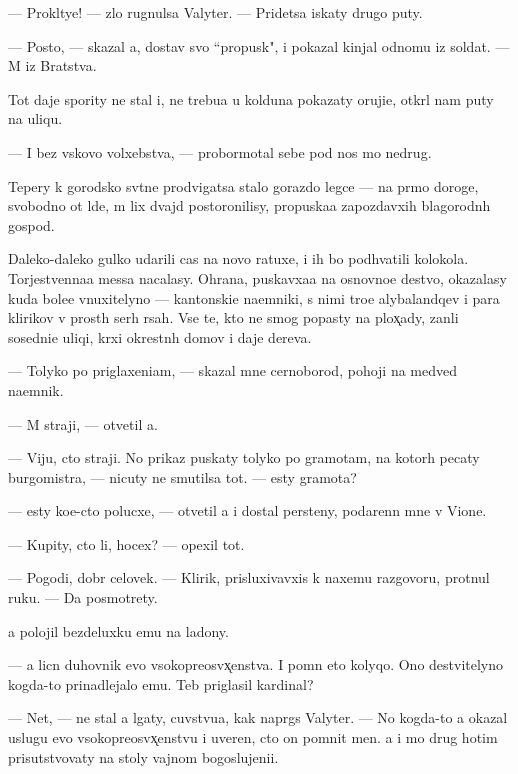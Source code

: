 \documentclass[10pt]{book}
\begin{document}
— Prokl{\ia}tye! — zlo rugnulsa Valyter. — Pridetsa iskaty drugo{\y} puty.

— Posto{\y}, — skazal {\y}a, dostav svo{\y} ``propusk", i pokazal kinjal odnomu iz soldat. — M{\yi} iz Bratstva.

Tot daje spority ne stal i, ne trebu{\y}a u kolduna pokazaty oruji{\y}e, otkr{\yi}l nam puty na uliqu.

— I bez vs{\ia}kovo volxebstva, — probormotal sebe pod nos mo{\y} nedrug.

Tepery k gorodsko{\y} sv{\ia}t{\yi}ne prodvigatsa stalo gorazdo legce — na pr{\ia}mo{\y} doroge, svobodno{\y} ot l{\iu}de{\y}, m{\yi} lix dvajd{\yi} postoronilisy, propuska{\y}a zapozdavxih blagorodn{\yi}h gospod.

Daleko-daleko gulko udarili cas{\yi} na novo{\y} ratuxe, i ih bo{\y} podhvatili kolokola. Torjestvenna{\y}a messa nacalasy. Ohrana, puskavxa{\y}a na osnovno{\y}e de{\y}stvo, okazalasy kuda bole{\y}e vnuxitelyno{\y} — kantonski{\y}e na{\y}emniki, s nimi tro{\y}e alybalandqev i para klirikov v prost{\yi}h ser{\yi}h r{\ia}sah. Vse te, kto ne smog popasty na plox̨ady, zan{\ia}li sosedni{\y}e uliqi, kr{\yi}xi okrestn{\yi}h domov i daje derev{\y}a.

— Tolyko po priglaxeni{\y}am, — skazal mne cernoborod{\yi}{\y}, pohoji{\y} na medved{\ia} na{\y}emnik.

— M{\yi} straji, — otvetil {\y}a.

— Viju, cto straji. No prikaz puskaty tolyko po gramotam, na kotor{\yi}h pecaty burgomistra, — nicuty ne smutilsa tot. — {\Y}esty gramota?

— {\Y}esty ko{\y}e-cto polucxe, — otvetil {\y}a i dostal persteny, podarenn{\yi}{\y} mne v Vione.

— Kupity, cto li, hocex? — opexil tot.

— Pogodi, dobr{\yi}{\y} celovek. — Klirik, prisluxivavxi{\y}s{\ia} k naxemu razgovoru, prot{\ia}nul ruku. — Da{\y} posmotrety.

{\Y}a polojil bezdeluxku {\y}emu na ladony.

— {\Y}a licn{\yi}{\y} duhovnik {\y}evo v{\yi}sokopreosv{\ia}x̨enstva. I pomn{\iu} eto kolyqo. Ono de{\y}stvitelyno kogda-to prinadlejalo {\y}emu. Teb{\ia} priglasil kardinal?

— Net, — ne stal {\y}a lgaty, cuvstvu{\y}a, kak napr{\ia}gs{\ia} Valyter. — No kogda-to {\y}a okazal uslugu {\y}evo v{\yi}sokopreosv{\ia}x̨enstvu i uveren, cto on pomnit men{\ia}. {\Y}a i mo{\y} drug hotim prisutstvovaty na stoly vajnom bogoslujeni{\y}i.
\end{document}
